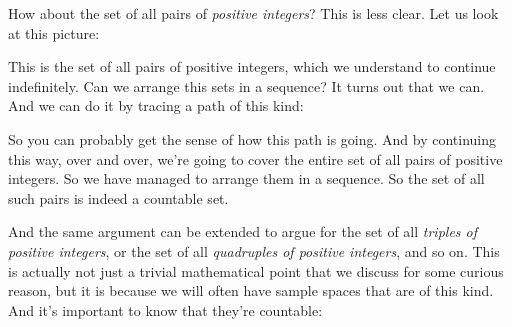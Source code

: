 \documentclass[pdftex, brazil, 12pt, twoside]{article}
\begin{document}
How about the set of all pairs of \emph{positive integers}?
This is less clear.
Let us look at this picture:

\begin{figure}[H]
  \begin{center}
  \end{center}
\end{figure}

This is the set of all pairs of positive integers, which we
understand to continue indefinitely.
Can we arrange this sets in a sequence?
It turns out that we can.
And we can do it by tracing a path of this kind:

\begin{figure}[H]
  \begin{center}
  \end{center}
\end{figure}

So you can probably get the sense of how
this path is going.
And by continuing this way, over and over, we're going to
cover the entire set of all pairs of positive integers.
So we have managed to arrange them in a sequence.
So the set of all such pairs is indeed a countable set.

And the same argument can be extended to argue for the set
of all \emph{triples of positive integers}, or the set of all
\emph{quadruples of positive integers}, and so on.
This is actually not just a trivial mathematical point
that we discuss for some curious reason, but it is
because we will often have sample spaces
that are of this kind.
And it's important to know that they're countable:
\end{document}
